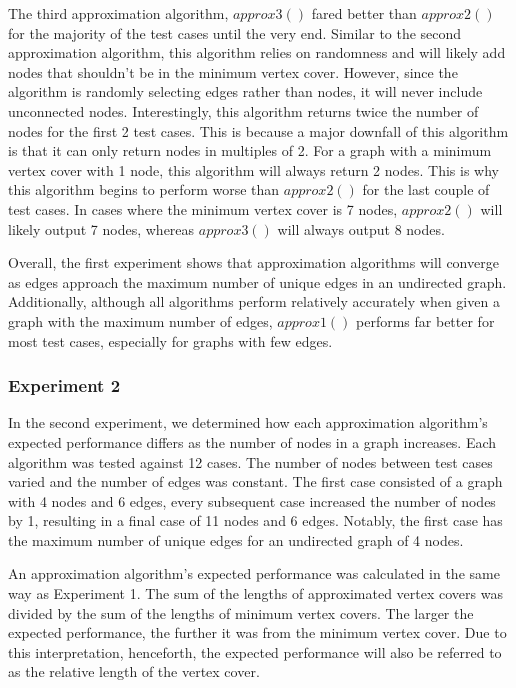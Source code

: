 \documentclass[titlepage]{article}
\begin{document}
The third approximation algorithm, $approx3()$ fared better than $approx2()$ for the majority of the test cases until the very end. Similar to the second approximation algorithm, this algorithm relies on randomness and will likely add nodes that shouldn't be in the minimum vertex cover. However, since the algorithm is randomly selecting edges rather than nodes, it will never include unconnected nodes. Interestingly, this algorithm returns twice the number of nodes for the first 2 test cases. This is because a major downfall of this algorithm is that it can only return nodes in multiples of 2. For a graph with a minimum vertex cover with 1 node, this algorithm will always return 2 nodes. This is why this algorithm begins to perform worse than $approx2()$ for the last couple of test cases. In cases where the minimum vertex cover is 7 nodes, $approx2()$ will likely output 7 nodes, whereas $approx3()$ will always output 8 nodes.

Overall, the first experiment shows that approximation algorithms will converge as edges approach the maximum number of unique edges in an undirected graph. Additionally, although all algorithms perform relatively accurately when given a graph with the maximum number of edges, $approx1()$ performs far better for most test cases, especially for graphs with few edges.

\subsubsection{Experiment 2}

In the second experiment, we determined how each approximation algorithm's expected performance differs as the number of nodes in a graph increases. Each algorithm was tested against 12 cases. The number of nodes between test cases varied and the number of edges was constant. The first case consisted of a graph with 4 nodes and 6 edges, every subsequent case increased the number of nodes by 1, resulting in a final case of 11 nodes and 6 edges. Notably, the first case has the maximum number of unique edges for an undirected graph of 4 nodes.

An approximation algorithm's expected performance was calculated in the same way as Experiment 1. The sum of the lengths of approximated vertex covers was divided by the sum of the lengths of minimum vertex covers. The larger the expected performance, the further it was from the minimum vertex cover. Due to this interpretation, henceforth, the expected performance will also be referred to as the relative length of the vertex cover.
\end{document}
